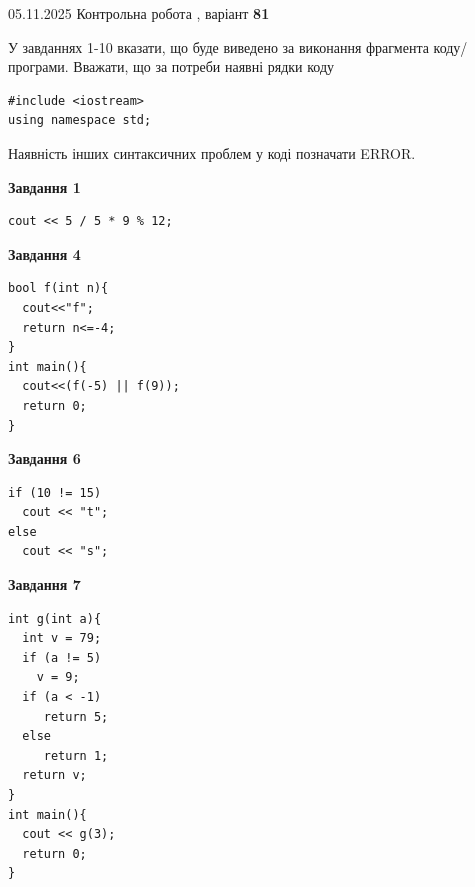 \documentclass[12pt, ukrainian]{article}
\begin{document}
{\Large{05.11.2025 Контрольна робота , варіант  \No \textbf { 81 }\par}}
{
\begin {large}
У завданнях 1-10 вказати, що буде виведено за виконання фрагмента коду/про\-гра\-ми.
Вважати, що за потреби наявні рядки коду
\begin{verbatim}
#include <iostream>
using namespace std;
\end{verbatim}
Наявність інших синтаксичних проблем у коді позначати ERROR.

\begin{minipage}[t]{7.0cm}

\begin{center}
\textbf{Завдання 1}
\end{center}
\vspace{-8mm}

\begin{verbatim}
cout << 5 / 5 * 9 % 12;
\end{verbatim}



\begin{center}
\textbf{Завдання 4}
\end{center}
\vspace{-8mm}

\begin{verbatim}
bool f(int n){
  cout<<"f";
  return n<=-4;
}
int main(){
  cout<<(f(-5) || f(9));
  return 0;
}
\end{verbatim}



\begin{center}
\textbf{Завдання 6}
\end{center}
\vspace{-8mm}

\begin{verbatim}
if (10 != 15)
  cout << "t";
else
  cout << "s";
\end{verbatim}



\begin{center}
\textbf{Завдання 7}
\end{center}
\vspace{-8mm}

\begin{verbatim}
int g(int a){
  int v = 79;
  if (a != 5)
    v = 9;
  if (a < -1)
     return 5;
  else
     return 1;
  return v;
}
int main(){
  cout << g(3);
  return 0;
}
\end{verbatim}


\end{minipage}
\end{large}}
\end{document}
